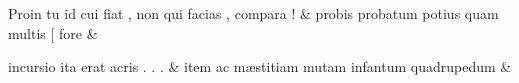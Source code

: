 \documentclass[12pt,onecolumn,twoside,a4paper]{memoir}
\begin{document}
\begin{pairs}
\begin{Leftside}
                              Proin
                              tu
                              id
                              cui
                              fiat
                              ,
                              non
                              qui
                              facias
                              ,
                              compara
                              ! \&
                         \stanza {}
                     probis
                              probatum
                              potius
                              quam
                              multis
                              [
                              fore \&
                         \stanza {}
                     
                              incursio
                              ita
                              erat
                              acris
                              .
                              .
                              . \&
                         \stanza {}
                     item
                              ac
                              mæstitiam
                              mutam
                              infantum
                              quadrupedum \&
                         \stanza {}
                     

\end{Leftside}
\end{pairs}
\end{document}
